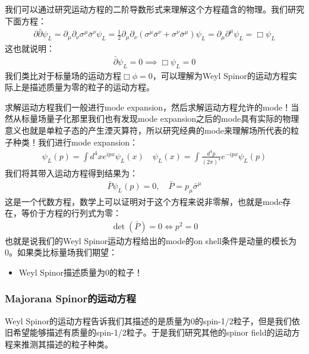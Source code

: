 \bigskip
{}

我们可以通过研究运动方程的二阶导数形式来理解这个方程蕴含的物理。我们研究下面方程：
\begin{align}
  \partial \bar{\partial} \psi_L = \partial_\mu \partial_\nu \sigma^\mu \bar{\sigma}^\nu \psi_L = \displaystyle\frac{1}{2} \partial_\mu \partial_\nu (\sigma^\mu \bar{\sigma}^\nu + \sigma^\nu \bar{\sigma}^\mu) \psi_L = \partial_\mu \partial^\mu \psi_L = \Box \psi_L
\end{align}
这也就说明：
\begin{align}
  \bar{\partial} \psi_L = 0 \implies \Box \psi_L = 0
\end{align}
我们类比对于标量场的运动方程$ \Box \phi = 0 $，可以理解为Weyl Spinor的运动方程实际上是描述质量为零的粒子的运动方程。
  

\bigskip
{}

求解运动方程我们一般进行mode expansion，然后求解运动方程允许的mode！当然从标量场量子化那里我们也有发现mode expansion之后的mode具有实际的物理意义也就是单粒子态的产生湮灭算符，所以研究经典的mode来理解场所代表的粒子种类！我们进行mode expansion：
\begin{align}
  \psi_L(p)=\int d^4xe^{ipx}\psi_L(x) \quad \psi_L(x)=\int \frac{d^4p}{(2\pi)^4}e^{-ipx}\psi_L(p)
\end{align}
我们将其带入运动方程得到结果为：
\begin{align}
  \bar{P}\psi_L(p)=0 , \quad \bar{P} = p_\mu \bar{\sigma}^\mu
\end{align}
这是一个代数方程，数学上可以证明对于这个方程来说非零解，也就是mode存在，等价于方程的行列式为零：
\begin{align}
  \det(\bar{P})=0\Leftrightarrow p^2=0
\end{align}
也就是说我们的Weyl Spinor运动方程给出的mode的on shell条件是动量的模长为0。如果类比标量场我们期望：
\begin{itemize}
  \item Weyl Spinor描述质量为0的粒子！
\end{itemize}

\subsubsection{Majorana Spinor的运动方程}
Weyl Spinor的运动方程告诉我们其描述的是质量为0的spin-1/2粒子，但是我们依旧希望能够描述有质量的spin-1/2粒子。于是我们研究其他的spinor field的运动方程来推测其描述的粒子种类。 

